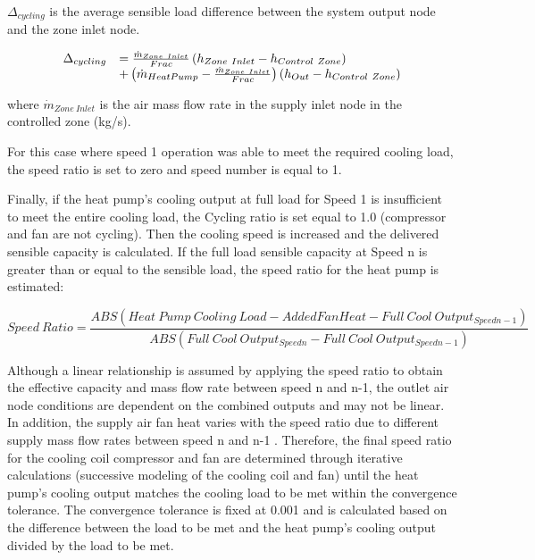 \(\Delta_{cycling}\) is the average sensible load difference between the system output node and the zone inlet node.

\begin{equation}
  \begin{array}{rl}
    \Delta_{cycling} &= \frac{\dot{m}_{Zone~Inlet}}{Frac} \left(h_{Zone~Inlet}-h_{Control~Zone}\right) \\
                           &+ \left(\dot{m}_{HeatPump} - \frac{\dot{m}_{Zone~Inlet}}{Frac}\right) \left(h_{Out} - h_{Control~Zone}\right)
  \end{array}
\end{equation}

where \({{{\dot m}_{Zone~Inlet}}}\) is the air mass flow rate in the supply inlet node in the controlled zone (kg/s).

For this case where speed 1 operation was able to meet the required cooling load, the speed ratio is set to zero and speed number is equal to 1.

Finally, if the heat pump's cooling output at full load for Speed 1 is insufficient to meet the entire cooling load, the Cycling ratio is set equal to 1.0 (compressor and fan are not cycling). Then the cooling speed is increased and the delivered sensible capacity is calculated. If the full load sensible capacity at Speed n is greater than or equal to the sensible load, the speed ratio for the heat pump is estimated:

\begin{equation}
Speed~Ratio = \frac{{ABS(Heat~Pump~Cooling~Load - AddedFanHeat - Full~Cool~ Outpu{t_{Speedn-1}})}}{{ABS(Full~Cool~Outpu{t_{Speedn}} - Full~Cool~Outpu{t_{Speedn-1}})}} 
\end{equation}

Although a linear relationship is assumed by applying the speed ratio to obtain the effective capacity and mass flow rate between speed n and n-1, the outlet air node conditions are dependent on the combined outputs and may not be linear. In addition, the supply air fan heat varies with the speed ratio due to different supply mass flow rates between speed n and n-1 . Therefore, the final speed ratio for the cooling coil compressor and fan are determined through iterative calculations (successive modeling of the cooling coil and fan) until the heat pump's cooling output matches the cooling load to be met within the convergence tolerance. The convergence tolerance is fixed at 0.001 and is calculated based on the difference between the load to be met and the heat pump's cooling output divided by the load to be met.

